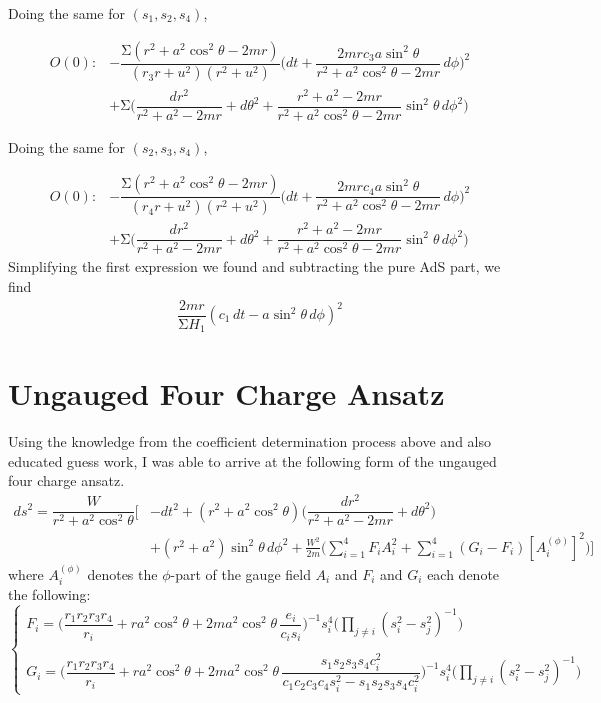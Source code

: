 \begin{ex}
Doing the same for $(s_1,s_2,s_4)$,

\[\begin{align*}
	O(0):&-\dfrac{\mathrm{\Sigma} (r^2+a^2\cos ^2\theta -2mr)}{(r_3r+u^2)(r^2+u^2)}\Big(dt+\dfrac{2mrc_3a\sin ^2\theta}{r^2+a^2\cos ^2\theta -2mr}\,d\phi \Big)^2\\
	&+\mathrm{\Sigma} \Big(\dfrac{dr^2}{r^2+a^2-2mr}+d\theta ^2+\dfrac{r^2+a^2-2mr}{r^2+a^2\cos ^2\theta -2mr}\sin ^2\theta \,d\phi ^2\Big)
\end{align*}\]

Doing the same for $(s_2,s_3,s_4)$,

\[\begin{align*}
	O(0):&-\dfrac{\mathrm{\Sigma} (r^2+a^2\cos ^2\theta -2mr)}{(r_4r+u^2)(r^2+u^2)}\Big(dt+\dfrac{2mrc_4a\sin ^2\theta}{r^2+a^2\cos ^2\theta -2mr}\,d\phi \Big)^2\\
	&+\mathrm{\Sigma} \Big(\dfrac{dr^2}{r^2+a^2-2mr}+d\theta ^2+\dfrac{r^2+a^2-2mr}{r^2+a^2\cos ^2\theta -2mr}\sin ^2\theta \,d\phi ^2\Big)
\end{align*}\]
Simplifying the first expression we found and subtracting the pure AdS part, we find
\[\begin{align*}
	\dfrac{2mr}{\mathrm{\Sigma} H_1}(c_1\,dt-a\sin ^2\theta \,d\phi )^2
\end{align*}\]
\end{ex}
\vspace{2ex}

\section{Ungauged Four Charge Ansatz}
Using the knowledge from the coefficient determination process above and also educated guess work, I was able to arrive at the following form of the ungauged four charge ansatz.
\[\begin{align*}
ds^2=\dfrac{W}{r^2+a^2\cos ^2\theta }\bigg[&-dt^2+(r^2+a^2\cos ^2\theta )\Big(\dfrac{dr^2}{r^2+a^2-2mr}+d\theta ^2\Big)\\&+(r^2+a^2)\sin ^2\theta \,d\phi ^2+\frac{W^2}{2m}\bigg(\sum ^{4}_{i=1}F_{i}A_{i}^2+\sum _{i=1}^{4}(G_{i}-F_{i})[A^{(\phi )}_{i}]^2\bigg)\bigg]
\end{align*}\]
where $A^{(\phi )}_{i}$ denotes the $\phi $-part of the gauge field $A_{i}$ and $F_{i}$ and $G_{i}$ each denote the following:
\[\begin{cases}
F_{i}=\bigg(\dfrac{r_1r_2r_3r_4}{r_{i}}+ra^2\cos ^2\theta +2ma^2\cos ^2\theta\, \dfrac{e_{i}}{c_{i}s_{i}}\bigg)^{-1}s_{i}^{4}\bigg(\displaystyle\prod_{j\ne i}^{}{(s_{i}^2-s_{j}^2)}^{-1}\bigg)\\\\
G_{i}=\Big(\dfrac{r_1r_2r_3r_4}{r_{i}}+ra^2\cos ^2\theta +2ma^2\cos ^2\theta\,\dfrac{s_1s_2s_3s_4c_{i}^2}{c_1c_2c_3c_4s_{i}^2-s_1s_2s_3s_4c_{i}^2}\Big)^{-1}s_{i}^{4}\bigg(\displaystyle\prod_{j\ne i}(s_{i}^2-s_{j}^2)^{-1}\bigg)
\end{cases}\]
